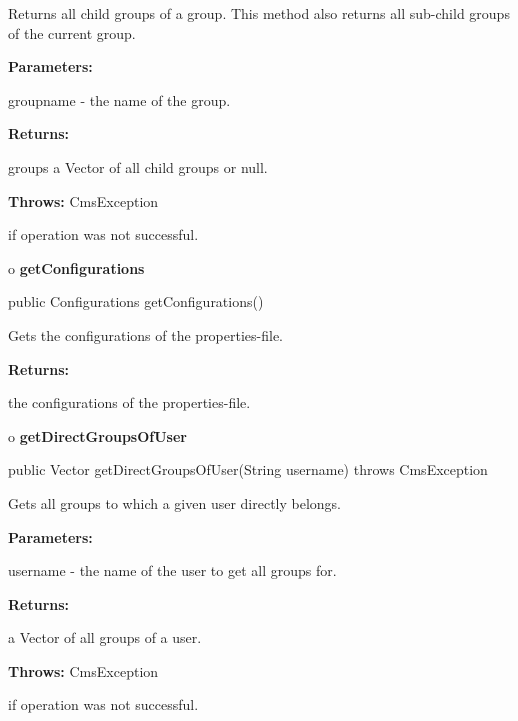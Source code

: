 \begin{description}
\htmlDD Returns all child groups of a group. \htmlBR
This method also returns all sub-child groups of the current group. 

\begin{description}
\item {\bf Parameters:}  

groupname - the name of the group.  
\item {\bf Returns:}  

groups a Vector of all child groups or null.  
\item {\bf Throws:} CmsException  

if operation was not successful.  
\end{description}

\end{description}

o {\bf getConfigurations} 

\begin{PRE}
 public Configurations getConfigurations()
\end{PRE}

\begin{description}
\htmlDD Gets the configurations of the properties-file. 

\begin{description}
\item {\bf Returns:}  

the configurations of the properties-file.  
\end{description}

\end{description}

o {\bf getDirectGroupsOfUser} 

\begin{PRE}
 public Vector getDirectGroupsOfUser(String username) throws CmsException
\end{PRE}

\begin{description}
\htmlDD Gets all groups to which a given user directly belongs. 

\begin{description}
\item {\bf Parameters:}  

username - the name of the user to get all groups for.  
\item {\bf Returns:}  

a Vector of all groups of a user.  
\item {\bf Throws:} CmsException  

if operation was not successful.  
\end{description}

\end{description}

